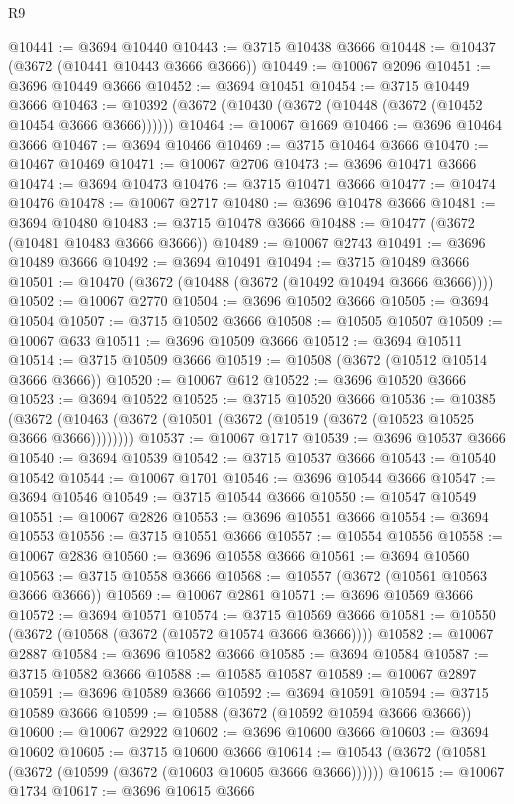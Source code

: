 \begin{lexlean}{R9}
\begin{coremodule}
@10441 := @3694 @10440
@10443 := @3715 @10438 @3666
@10448 := @10437 (@3672 (@10441 @10443 @3666 @3666))
@10449 := @10067 @2096
@10451 := @3696 @10449 @3666
@10452 := @3694 @10451
@10454 := @3715 @10449 @3666
@10463 := @10392 (@3672 (@10430 (@3672 (@10448 (@3672 (@10452 @10454 @3666 @3666))))))
@10464 := @10067 @1669
@10466 := @3696 @10464 @3666
@10467 := @3694 @10466
@10469 := @3715 @10464 @3666
@10470 := @10467 @10469
@10471 := @10067 @2706
@10473 := @3696 @10471 @3666
@10474 := @3694 @10473
@10476 := @3715 @10471 @3666
@10477 := @10474 @10476
@10478 := @10067 @2717
@10480 := @3696 @10478 @3666
@10481 := @3694 @10480
@10483 := @3715 @10478 @3666
@10488 := @10477 (@3672 (@10481 @10483 @3666 @3666))
@10489 := @10067 @2743
@10491 := @3696 @10489 @3666
@10492 := @3694 @10491
@10494 := @3715 @10489 @3666
@10501 := @10470 (@3672 (@10488 (@3672 (@10492 @10494 @3666 @3666))))
@10502 := @10067 @2770
@10504 := @3696 @10502 @3666
@10505 := @3694 @10504
@10507 := @3715 @10502 @3666
@10508 := @10505 @10507
@10509 := @10067 @633
@10511 := @3696 @10509 @3666
@10512 := @3694 @10511
@10514 := @3715 @10509 @3666
@10519 := @10508 (@3672 (@10512 @10514 @3666 @3666))
@10520 := @10067 @612
@10522 := @3696 @10520 @3666
@10523 := @3694 @10522
@10525 := @3715 @10520 @3666
@10536 := @10385
    (@3672 (@10463 (@3672 (@10501 (@3672 (@10519 (@3672 (@10523 @10525 @3666 @3666))))))))
@10537 := @10067 @1717
@10539 := @3696 @10537 @3666
@10540 := @3694 @10539
@10542 := @3715 @10537 @3666
@10543 := @10540 @10542
@10544 := @10067 @1701
@10546 := @3696 @10544 @3666
@10547 := @3694 @10546
@10549 := @3715 @10544 @3666
@10550 := @10547 @10549
@10551 := @10067 @2826
@10553 := @3696 @10551 @3666
@10554 := @3694 @10553
@10556 := @3715 @10551 @3666
@10557 := @10554 @10556
@10558 := @10067 @2836
@10560 := @3696 @10558 @3666
@10561 := @3694 @10560
@10563 := @3715 @10558 @3666
@10568 := @10557 (@3672 (@10561 @10563 @3666 @3666))
@10569 := @10067 @2861
@10571 := @3696 @10569 @3666
@10572 := @3694 @10571
@10574 := @3715 @10569 @3666
@10581 := @10550 (@3672 (@10568 (@3672 (@10572 @10574 @3666 @3666))))
@10582 := @10067 @2887
@10584 := @3696 @10582 @3666
@10585 := @3694 @10584
@10587 := @3715 @10582 @3666
@10588 := @10585 @10587
@10589 := @10067 @2897
@10591 := @3696 @10589 @3666
@10592 := @3694 @10591
@10594 := @3715 @10589 @3666
@10599 := @10588 (@3672 (@10592 @10594 @3666 @3666))
@10600 := @10067 @2922
@10602 := @3696 @10600 @3666
@10603 := @3694 @10602
@10605 := @3715 @10600 @3666
@10614 := @10543 (@3672 (@10581 (@3672 (@10599 (@3672 (@10603 @10605 @3666 @3666))))))
@10615 := @10067 @1734
@10617 := @3696 @10615 @3666

\end{coremodule}
\end{lexlean}
